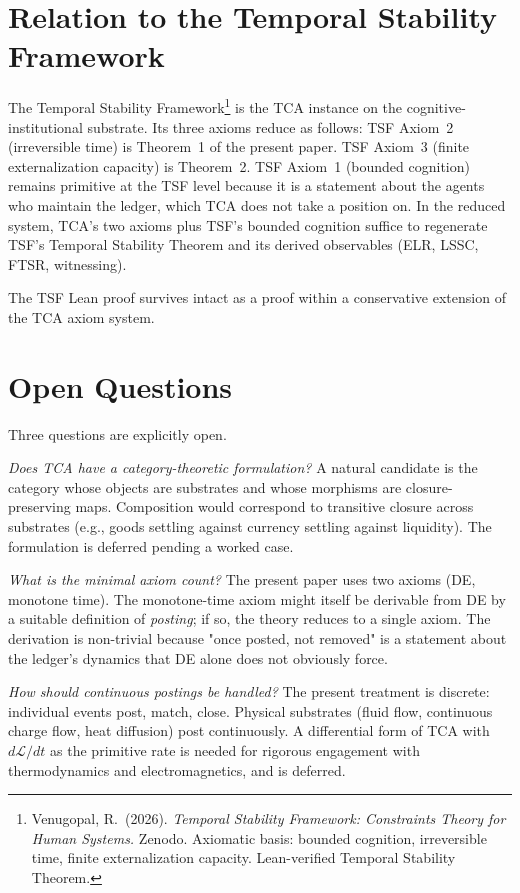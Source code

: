 \documentclass[11pt]{article}
\begin{document}
\section{Relation to the Temporal Stability Framework}

The Temporal Stability Framework\footnote{Venugopal, R.\ (2026). \emph{Temporal Stability Framework: Constraints Theory for Human Systems.} Zenodo. Axiomatic basis: bounded cognition, irreversible time, finite externalization capacity. Lean-verified Temporal Stability Theorem.} is the TCA instance on the cognitive-institutional substrate. Its three axioms reduce as follows: TSF Axiom~2 (irreversible time) is Theorem~1 of the present paper. TSF Axiom~3 (finite externalization capacity) is Theorem~2. TSF Axiom~1 (bounded cognition) remains primitive at the TSF level because it is a statement about the agents who maintain the ledger, which TCA does not take a position on. In the reduced system, TCA's two axioms plus TSF's bounded cognition suffice to regenerate TSF's Temporal Stability Theorem and its derived observables (ELR, LSSC, FTSR, witnessing).

The TSF Lean proof survives intact as a proof within a conservative extension of the TCA axiom system.

\section{Open Questions}

Three questions are explicitly open.

\emph{Does TCA have a category-theoretic formulation?} A natural candidate is the category whose objects are substrates and whose morphisms are closure-preserving maps. Composition would correspond to transitive closure across substrates (e.g., goods settling against currency settling against liquidity). The formulation is deferred pending a worked case.

\emph{What is the minimal axiom count?} The present paper uses two axioms (DE, monotone time). The monotone-time axiom might itself be derivable from DE by a suitable definition of \emph{posting}; if so, the theory reduces to a single axiom. The derivation is non-trivial because "once posted, not removed" is a statement about the ledger's dynamics that DE alone does not obviously force.

\emph{How should continuous postings be handled?} The present treatment is discrete: individual events post, match, close. Physical substrates (fluid flow, continuous charge flow, heat diffusion) post continuously. A differential form of TCA with $d\mathcal{L}/dt$ as the primitive rate is needed for rigorous engagement with thermodynamics and electromagnetics, and is deferred.
\end{document}

